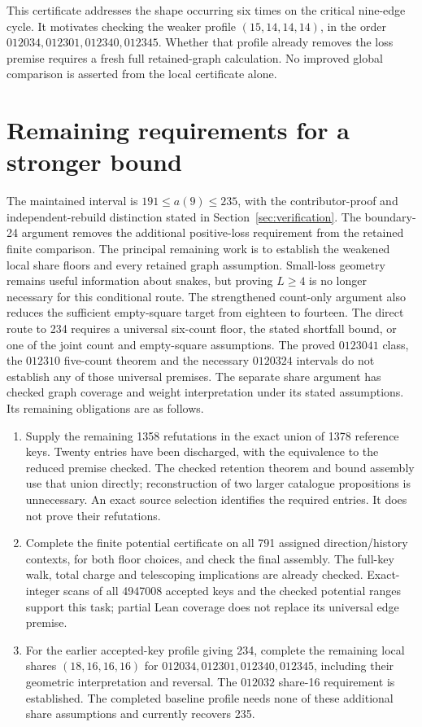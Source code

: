 \documentclass[11pt,a4paper]{article}
\theoremstyle{definition}
\theoremstyle{remark}
\begin{document}
This certificate addresses the shape occurring six times on the critical
nine-edge cycle. It motivates checking the weaker profile $(15,14,14,14)$,
in the order $012034,012301,012340,012345$. Whether that profile already
removes the loss premise requires a fresh full retained-graph calculation.
No improved global comparison is asserted from the local certificate alone.

\section{Remaining requirements for a stronger bound}\label{sec:closure}
The maintained interval is $191\le a(9)\le235$, with the contributor-proof
and independent-rebuild distinction stated in Section~\ref{sec:verification}.
The boundary-24 argument removes the additional positive-loss requirement
from the retained finite comparison. The principal remaining work is to
establish the weakened local share floors and every retained graph
assumption. Small-loss geometry remains useful information about snakes,
but proving $L\ge4$ is no longer necessary for this conditional route.
The strengthened count-only argument also reduces the sufficient
empty-square target from eighteen to fourteen.
The direct route to 234 requires a universal six-count floor, the stated
shortfall bound, or one of the joint count and empty-square assumptions.
The proved $0123041$ class, the $012310$ five-count theorem and the necessary
$0120324$ intervals do not establish any of those universal premises.
The separate share argument has checked graph coverage and weight
interpretation under its stated assumptions. Its remaining obligations are
as follows.

\begin{enumerate}
\item Supply the remaining 1358 refutations in the exact union of 1378
reference keys. Twenty entries have been discharged, with the equivalence
to the reduced premise checked. The checked retention theorem and bound assembly use that
union directly; reconstruction of two larger catalogue propositions is
unnecessary. An exact source selection identifies the required entries.
It does not prove their refutations.
\item Complete the finite potential certificate on all 791 assigned
direction/history contexts, for both floor choices, and check the final
assembly. The full-key walk, total charge and telescoping implications
are already checked. Exact-integer scans of all 4947008 accepted keys and
the checked potential ranges support this task; partial Lean coverage
does not replace its universal edge premise.
\item For the earlier accepted-key profile giving 234, complete the remaining local shares
$(18,16,16,16)$ for $012034,012301,012340,012345$, including
their geometric interpretation and reversal. The $012032$ share-16
requirement is established. The completed baseline profile needs none
of these additional share assumptions and currently recovers 235.
\end{enumerate}
\end{document}
